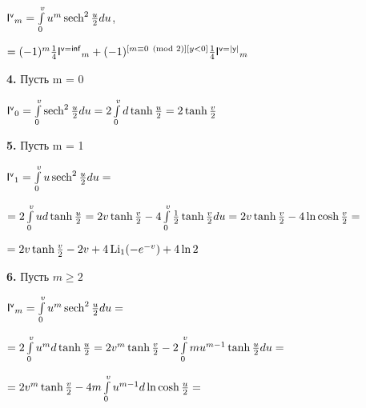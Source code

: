 \documentclass[a4paper,12pt]{article}
\begin{document}
 $\mathsf{I^{v}}_m = \int\limits_0^{v} u^m \operatorname{sech}^2{u\over{2}} d u$, 

\begin{center}
    $= (-1)^m {1\over{4}} \mathsf{I^{v = inf}}_m  + (-1)^{[m \equiv 0 \pmod{2}][y < 0]} {1\over{4}} \mathsf{I^{v = |y|}}_m$
\end{center}

\noindent\textbf{4.} Пусть m = 0

\begin{center}
    $\mathsf{I^{v}}_0 = \int\limits_0^{v} \operatorname{sech}^2{u\over{2}} d u = 2\int\limits_{0}^v d\operatorname{tanh}{u\over{2}} = 2 \operatorname{tanh}{v\over{2}}$
\end{center}

\noindent\textbf{5.} Пусть m = 1

\begin{center}
    $\mathsf{I^{v}}_1 = \int\limits_0^{v} u \operatorname{sech}^2{u\over{2}} d u =$
\end{center}

\begin{center}
    $= 2\int\limits_{0}^v u d\operatorname{tanh}{u\over{2}} = 2v \operatorname{tanh}{v\over{2}} - 4\int\limits_0^v {1\over{2}} \operatorname{tanh}{v\over{2}}du = 2v\operatorname{tanh}{v\over{2}} - 4\ln{\operatorname{cosh}{v\over{2}}} =$
\end{center}

\begin{center}
    $= 2v\operatorname{tanh}{v\over{2}} - 2v + 4\operatorname{Li_1}(-e^{-v}) + 4\ln{2}$
\end{center}

\noindent\textbf{6.} Пусть $m \geq{2}$

\begin{center}
    $\mathsf{I^{v}}_m = \int\limits_0^{v} u^m \operatorname{sech}^2{u\over{2}} d u =$
\end{center}

\begin{center}
    $= 2\int\limits_{0}^v u^m d\operatorname{tanh}{u\over{2}} = 2v^m \operatorname{tanh}{v\over{2}} - 2\int\limits_0^v m u^{m - 1} \operatorname{tanh}{u\over{2}}d u = $
\end{center}

\begin{center}
    $= 2v^m \operatorname{tanh}{v\over{2}} - 4 m \int\limits_0^v u^{m - 1} d \ln{\operatorname{cosh}{u\over{2}}} =$
\end{center}
\end{document}
